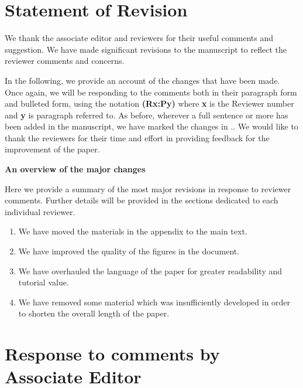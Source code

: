 \documentclass{letter}
\newcommand{\rr}[1]{{\bf \color{blue}{#1}}}
\begin{document}
\section{Statement of Revision}

We thank the associate editor and reviewers for their useful comments and suggestion. We have made significant revisions to the manuscript to reflect the reviewer comments and concerns. 

In the following, we provide an account of the changes that have been made. Once again, we will be responding to the comments both in their paragraph form and bulleted form, using the notation {\bf {\color{red}(Rx:Py)}} where {\bf x} is the Reviewer number and {\bf y} is paragraph referred to. %
As before, wherever a full sentence or more has been added in the manuscript, we have marked the changes in \rr{blue}.. We would like to thank the reviewers for their time and effort in providing feedback for the improvement of the paper.

\noindent\textbf{An overview of the major changes}

Here we provide a summary of the most major revisions in response to reviewer comments. Further details will be provided in the sections dedicated to each individual reviewer.

\begin{enumerate}
\item We have moved the materials in the appendix to the main text.
\item We have improved the quality of the figures in the document.
\item We have overhauled the language of the paper for greater readability and tutorial value.
\item We have removed some material which was insufficiently developed in order to shorten the overall length of the paper.

\end{enumerate}

\section{Response to comments by Associate Editor}
\end{document}
